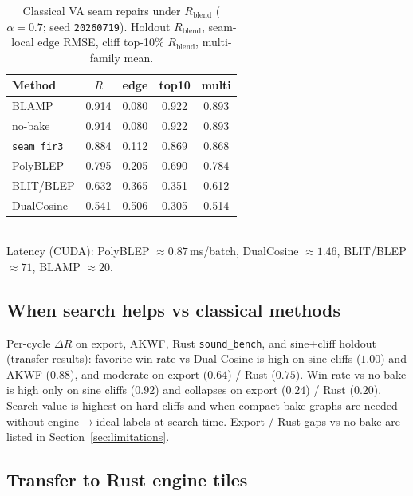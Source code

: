 \begin{table}[t]
  \centering
  \caption{Classical VA seam repairs under $R_{\mathrm{blend}}$ ($\alpha{=}0.7$; seed \texttt{20260719}).
  Holdout $R_{\mathrm{blend}}$, seam-local edge RMSE, cliff top-10\% $R_{\mathrm{blend}}$, multi-family mean.}
  \label{tab:va-seam-blep}
  \setlength{\tabcolsep}{3pt}
  \footnotesize
  \begin{tabular}{@{}lcccc@{}}
    \toprule
    Method & $R$ & edge & top10 & multi \\
    \midrule
    BLAMP & 0.914 & 0.080 & 0.922 & 0.893 \\
    no-bake & 0.914 & 0.080 & 0.922 & 0.893 \\
    \texttt{seam\_fir3} & 0.884 & 0.112 & 0.869 & 0.868 \\
    PolyBLEP & 0.795 & 0.205 & 0.690 & 0.784 \\
    BLIT/BLEP & 0.632 & 0.365 & 0.351 & 0.612 \\
    DualCosine & 0.541 & 0.506 & 0.305 & 0.514 \\
    \bottomrule
  \end{tabular}\\[0.35em]
  {\footnotesize Latency (CUDA): PolyBLEP ${\approx}0.87$\,ms/batch, DualCosine ${\approx}1.46$, BLIT/BLEP ${\approx}71$, BLAMP ${\approx}20$.}
\end{table}





\subsection{When search helps vs classical methods}
\label{sec:transfer}

Per-cycle $\Delta R$ on export, AKWF, Rust \texttt{sound\_bench}, and sine{+}cliff holdout
(\href{https://github.com/reeldemo/denoise-opt-meta/blob/master/paper/Unsupervised_Wrap-Discontinuity_Repair_in_Wavetable_Synthesis_via_Hybrid_GA-PPO_Meta-Search_v12/figures/transfer_failures.json}{transfer results}):
favorite win-rate vs Dual Cosine is high on sine cliffs ($1.00$) and AKWF ($0.88$), and moderate on export ($0.64$) / Rust ($0.75$).
Win-rate vs no-bake is high only on sine cliffs ($0.92$) and collapses on export ($0.24$) / Rust ($0.20$).
Search value is highest on hard cliffs and when compact bake graphs are needed without engine$\to$ideal labels at search time.
Export / Rust gaps vs no-bake are listed in Section~\ref{sec:limitations}.

\subsection{Transfer to Rust engine tiles}
\label{sec:rust-bench}

